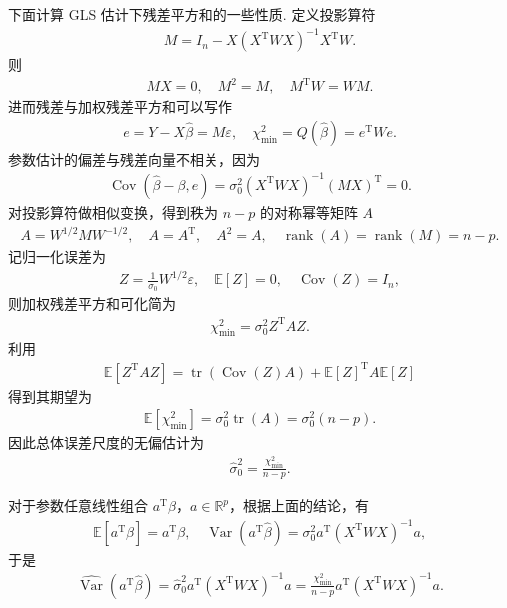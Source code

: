 下面计算 GLS 估计下残差平方和的一些性质.
定义投影算符
\begin{align*}
	M=I_n-X(X^\mathrm{T}WX)^{-1}X^\mathrm{T}W.
\end{align*}
则
\begin{align*}
	MX=0,
	\quad M^2=M,
	\quad M^\mathrm{T}W=WM.
\end{align*}
进而残差与加权残差平方和可以写作
\begin{align*}
	e=Y-X\hat{\beta}=M\varepsilon,
	\quad \chi_{\min}^2=Q(\hat{\beta})=e^\mathrm{T}We.
\end{align*}
参数估计的偏差与残差向量不相关，因为
\begin{align*}
	\operatorname{Cov}(\hat{\beta}-\beta,e)
	=\sigma_0^2(X^\mathrm{T}WX)^{-1}(MX)^\mathrm{T}=0.
\end{align*}
对投影算符做相似变换，得到秩为 \(n-p\) 的对称幂等矩阵 \(A\)
\begin{align*}
	A=W^{1/2}MW^{-1/2},
	\quad A=A^\mathrm{T},\quad A^2=A,
	\quad \operatorname{rank}(A)=\operatorname{rank}(M)=n-p.
\end{align*}
记归一化误差为
\begin{align*}
	Z=\frac{1}{\sigma_0}W^{1/2}\varepsilon,
	\quad \mathbb{E}[Z]=0,
	\quad \operatorname{Cov}(Z)=I_n,
\end{align*}
则加权残差平方和可化简为
\begin{align*}
	\chi_{\min}^2=\sigma_0^2Z^\mathrm{T}AZ.
\end{align*}
利用
\begin{align*}
	\mathbb{E}[Z^\mathrm{T}AZ]
	=\operatorname{tr}(\operatorname{Cov}(Z)A)+\mathbb{E}[Z]^\mathrm{T}A\mathbb{E}[Z]
\end{align*}
得到其期望为
\begin{align*}
	\mathbb{E}[\chi_{\min}^2]=\sigma_0^2\operatorname{tr}(A)=\sigma_0^2(n-p).
\end{align*}
因此总体误差尺度的无偏估计为
\begin{align*}
	\hat{\sigma}_0^2=\frac{\chi_{\min}^2}{n-p}.
\end{align*}

对于参数任意线性组合 \(a^\mathrm{T}\beta\)，\(a\in\mathbb{R}^p\)，根据上面的结论，有
\begin{align*}
	\mathbb{E}[a^\mathrm{T}\hat{\beta}]=a^\mathrm{T}\beta,
	\quad \operatorname{Var}(a^\mathrm{T}\hat{\beta})
	=\sigma_0^2a^\mathrm{T}(X^\mathrm{T}WX)^{-1}a,
\end{align*}
于是
\begin{align*}
	\widehat{\operatorname{Var}}(a^\mathrm{T}\hat{\beta})
	=\hat{\sigma}_0^2a^\mathrm{T}(X^\mathrm{T}WX)^{-1}a
	=\frac{\chi_{\min}^2}{n-p}a^\mathrm{T}(X^\mathrm{T}WX)^{-1}a.
\end{align*}

